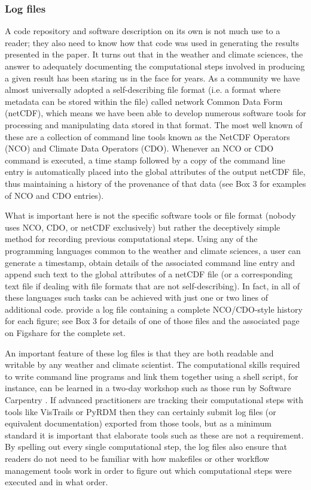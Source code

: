 \subsubsection{Log files}\label{s:log_files}

A code repository and software description on its own is not much use to a reader; they also need to know how that code was used in generating the results presented in the paper. It turns out that in the weather and climate sciences, the answer to adequately documenting the computational steps involved in producing a given result has been staring us in the face for years. As a community we have almost universally adopted a self-describing file format (i.e. a format where metadata can be stored within the file) called network Common Data Form (netCDF), which means we have been able to develop numerous software tools for processing and manipulating data stored in that format. The most well known of these are a collection of command line tools known as the NetCDF Operators (NCO) and Climate Data Operators (CDO). Whenever an NCO or CDO command is executed, a time stamp followed by a copy of the command line entry is automatically placed into the global attributes of the output netCDF file, thus maintaining a history of the provenance of that data (see Box 3 for examples of NCO and CDO entries).

What is important here is not the specific software tools or file format (nobody uses NCO, CDO, or netCDF exclusively) but rather the deceptively simple method for recording previous computational steps. Using any of the programming languages common to the weather and climate sciences, a user can generate a timestamp, obtain details of the associated command line entry and append such text to the global attributes of a netCDF file (or a corresponding text file if dealing with file formats that are not self-describing). In fact, in all of these languages such tasks can be achieved with just one or two lines of additional code. \citet{Irving2016} provide a log file containing a complete NCO/CDO-style history for each figure; see Box 3 for details of one of those files and the associated page on Figshare \citep{Irving2015} for the complete set.

An important feature of these log files is that they are both readable and writable by any weather and climate scientist. The computational skills required to write command line programs and link them together using a shell script, for instance, can be learned in a two-day workshop such as those run by Software Carpentry \citep{Wilson2014}. If advanced practitioners are tracking their computational steps with tools like VisTrails or PyRDM then they can certainly submit log files (or equivalent documentation) exported from those tools, but as a minimum standard it is important that elaborate tools such as these are not a requirement. By spelling out every single computational step, the log files also ensure that readers do not need to be familiar with how makefiles or other workflow management tools work in order to figure out which computational steps were executed and in what order. 

